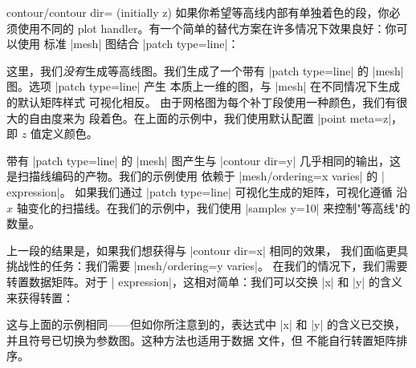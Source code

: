 {{\begin{pgfplotskey}{contour/contour dir= (initially z)}
    如果你希望等高线内部有单独着色的段，你必须使用不同的 plot
    handler。有一个简单的替代方案在许多情况下效果良好：你可以使用
    标准 |mesh| 图结合 |patch type=line|：

\pgfplotsexpensiveexample
\begin{codeexample}[]
\end{codeexample}

    这里，我们\emph{没有}生成等高线图。我们生成了一个带有
    |patch type=line| 的 |mesh| 图。选项 |patch type=line| 产生
    本质上一维的图，与 |mesh| 在不同情况下生成的默认矩阵样式
    可视化相反。
    由于网格图为每个补丁段使用一种颜色，我们有很大的自由度来为
    段着色。在上面的示例中，我们使用默认配置 |point meta=z|，
    即 $z$ 值定义颜色。

    带有 |patch type=line| 的 |mesh| 图产生与 |contour dir=y|
    几乎相同的输出，这是扫描线编码的产物。我们的示例使用
    依赖于 |mesh/ordering=x varies| 的 | expression|。
    如果我们通过 |patch type=line| 可视化生成的矩阵，可视化遵循
    沿 $x$ 轴变化的扫描线。在我们的示例中，我们使用
    |samples y=10| 来控制"等高线"的数量。

    上一段的结果是，如果我们想获得与 |contour dir=x| 相同的效果，
    我们面临更具挑战性的任务：我们需要 |mesh/ordering=y varies|。
    在我们的情况下，我们需要转置数据矩阵。对于
    | expression|，这相对简单：我们可以交换 |x| 和 |y|
    的含义来获得转置：

\pgfplotsexpensiveexample
\begin{codeexample}[]
\end{codeexample}
    这与上面的示例相同——但如你所注意到的，表达式中 |x| 和 |y|
    的含义已交换，并且符号已切换为参数图。这种方法也适用于数据
    文件，但 \PGFPlots{} 不能自行转置矩阵排序。



\end{pgfplotskey}}}

